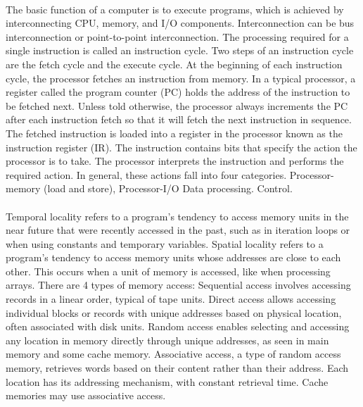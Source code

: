 \documentclass{article}
\begin{document}
\begin{enumerate}
	      \paragraph{} The basic function of a computer is to execute programs, which is achieved by interconnecting CPU,
	      memory, and I/O components. Interconnection can be bus interconnection or point-to-point
	      interconnection. The processing required for a single instruction is called an instruction cycle. Two steps of an instruction
	      cycle are the fetch cycle and the execute cycle. At the beginning of each instruction cycle, the processor fetches an instruction from memory. In a
	      typical processor, a register called the program counter (PC) holds the address of the instruction to be
	      fetched next. Unless told otherwise, the processor always increments the PC after each instruction fetch
	      so that it will fetch the next instruction in sequence. The fetched instruction is loaded into a register in the processor known as the instruction register (IR).
	      The instruction contains bits that specify the action the processor is to take. The processor interprets the
	      instruction and performs the required action. In general, these actions fall into four categories.
	      Processor-memory (load and store), Processor-I/O Data processing. Control.

		  \paragraph{} Temporal locality refers to a program's tendency to access memory units in the near future that were 
		  recently accessed in the past, such as in iteration loops or when using constants and temporary variables. Spatial 
		  locality refers to a program's tendency to access memory units whose addresses are close to each other. This 
		  occurs when a unit of memory is accessed, like when processing arrays. There are 4 types of memory access: Sequential 
		  access involves accessing records in a linear order, typical of tape units. Direct access allows accessing individual 
		  blocks or records with unique addresses based on physical location, often associated with disk units. Random access 
		  enables selecting and accessing any location in memory directly through unique addresses, as seen in main memory and 
		  some cache memory. Associative access, a type of random access memory, retrieves words based on their content rather 
		  than their address. Each location has its addressing mechanism, with constant retrieval time. Cache memories may use 
		  associative access.


\end{enumerate}
\end{document}
